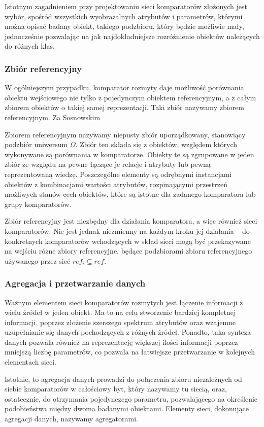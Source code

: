\documentclass{pracalicmgr}
\begin{document}
    Istotnym zagadnieniem przy projektowaniu sieci komparatorów złożonych jest wybór, spośród wszystkich wyobrażalnych atrybutów i parametrów, którymi można opisać badany obiekt, takiego podzbioru, który będzie możliwie mały, jednocześnie pozwalając na jak najdokładniejsze rozróżnienie obiektów należących do różnych klas.
    \subsubsection{Zbiór referencyjny}
    W ogólniejszym przypadku, komparator rozmyty daje możliwość porównania obiektu wejściowego nie tylko z pojedynczym obiektem referencyjnym, a z całym zbiorem obiektów o takiej samej reprezentacji. Taki zbiór nazywamy zbiorem referencyjnym. Za Sosnowskim 
    \begin{defn}
        Zbiorem referencyjnym nazywamy niepusty zbiór uporządkowany, stanowiący podzbiór uniwersum $\Omega$. Zbiór ten składa się z obiektów, względem których wykonywane są porównania w komparatorze. Obiekty te są zgrupowane w jeden zbiór ze względu na pewne łączące je relacje i atrybuty lub pewną reprezentowaną wiedzę. Poszczególne elementy są odrębnymi instancjami obiektów z kombinacjami wartości atrybutów, rozpinającymi przestrzeń możliwych stanów cech obiektów, które są istotne dla zadanego komparatora lub grupy komparatorów. 
    \end{defn}
    Zbiór referencyjny jest niezbędny dla działania komparatora, a więc również sieci komparatorów. Nie jest jednak niezmienny na każdym kroku jej działania -- do konkretnych komparatorów wchodzących w skład sieci mogą być przekazywane na wejściu różne zbiory referencyjne, będące podzbiorami zbioru referencyjnego używanego przez sieć $ref_i \subseteq ref$.
    \subsubsection{Agregacja i przetwarzanie danych}
    Ważnym elementem sieci komparatorów rozmytych jest łączenie informacji z wielu źródeł w jeden obiekt. Ma to na celu stworzenie bardziej kompletnej informacji, poprzez złożenie szerszego spektrum atrybutów oraz wzajemne uzupełnianie się danych pochodzących z różnych źródeł. Ponadto, taka synteza danych pozwala również na reprezentację większej ilości informacji poprzez mniejszą liczbę parametrów, co pozwala na łatwiejsze przetwarzanie w kolejnych elementach sieci.
    
    Istotnie, to agregacja danych prowadzi do połączenia zbioru niezależnych od siebie komparatorów w całościowy byt, który nazywamy tu siecią, oraz, ostatecznie, do otrzymania pojedynczego parametru, pozwalającego na określenie podobieństwa między dwoma badanymi obiektami. Elementy sieci, dokonujące agregacji danych, nazywamy agregatorami.
    
\end{document}
